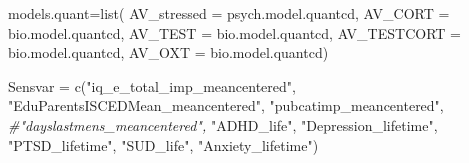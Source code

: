 \documentclass[
]{article}
\newenvironment{Shaded}{\begin{snugshade}}{\end{snugshade}}
\newcommand{\AttributeTok}[1]{\textcolor[rgb]{0.77,0.63,0.00}{#1}}
\newcommand{\CommentTok}[1]{\textcolor[rgb]{0.56,0.35,0.01}{\textit{#1}}}
\newcommand{\FunctionTok}[1]{\textcolor[rgb]{0.00,0.00,0.00}{#1}}
\newcommand{\NormalTok}[1]{#1}
\newcommand{\OtherTok}[1]{\textcolor[rgb]{0.56,0.35,0.01}{#1}}
\newcommand{\StringTok}[1]{\textcolor[rgb]{0.31,0.60,0.02}{#1}}
\begin{document}
\begin{Shaded}
\begin{Highlighting}[]
\NormalTok{models.quant}\OtherTok{=}\FunctionTok{list}\NormalTok{(}
  \AttributeTok{AV\_stressed =}\NormalTok{ psych.model.quantcd,}
  \AttributeTok{AV\_CORT =}\NormalTok{ bio.model.quantcd,}
  \AttributeTok{AV\_TEST =}\NormalTok{ bio.model.quantcd,}
  \AttributeTok{AV\_TESTCORT =}\NormalTok{ bio.model.quantcd,}
  \AttributeTok{AV\_OXT =}\NormalTok{ bio.model.quantcd)}


\NormalTok{Sensvar }\OtherTok{=} \FunctionTok{c}\NormalTok{(}\StringTok{"iq\_e\_total\_imp\_meancentered"}\NormalTok{,}
           \StringTok{"EduParentsISCEDMean\_meancentered"}\NormalTok{,}
           \StringTok{"pubcatimp\_meancentered"}\NormalTok{,}
           \CommentTok{\#"dayslastmens\_meancentered",}
           \StringTok{"ADHD\_life"}\NormalTok{,}
           \StringTok{"Depression\_lifetime"}\NormalTok{,}
           \StringTok{"PTSD\_lifetime"}\NormalTok{,}
           \StringTok{"SUD\_life"}\NormalTok{,}
           \StringTok{"Anxiety\_lifetime"}\NormalTok{)}
\end{Highlighting}
\end{Shaded}
\end{document}
